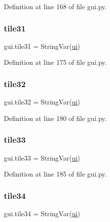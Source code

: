 Definition at line 168 of file gui.\+py.

\mbox{\label{namespacegui_a587d16eda380c21d3eddbf1fbc9716ce}} 
\subsubsection{\texorpdfstring{tile31}{tile31}}
{\footnotesize\ttfamily gui.\+tile31 = String\+Var(\mbox{\hyperlink{namespacegui_a40ab7281456eadbea2dc2038f5c24fa1}{ui}})}



Definition at line 175 of file gui.\+py.

\mbox{\label{namespacegui_a54c6af9760148973c56dea68ffa9b9c7}} 
\subsubsection{\texorpdfstring{tile32}{tile32}}
{\footnotesize\ttfamily gui.\+tile32 = String\+Var(\mbox{\hyperlink{namespacegui_a40ab7281456eadbea2dc2038f5c24fa1}{ui}})}



Definition at line 180 of file gui.\+py.

\mbox{\label{namespacegui_aa338802b7dcd13afe3034f0bd6b4ac4e}} 
\subsubsection{\texorpdfstring{tile33}{tile33}}
{\footnotesize\ttfamily gui.\+tile33 = String\+Var(\mbox{\hyperlink{namespacegui_a40ab7281456eadbea2dc2038f5c24fa1}{ui}})}



Definition at line 185 of file gui.\+py.

\mbox{\label{namespacegui_a4f827dfac57ca6256640fa244ffa1453}} 
\subsubsection{\texorpdfstring{tile34}{tile34}}
{\footnotesize\ttfamily gui.\+tile34 = String\+Var(\mbox{\hyperlink{namespacegui_a40ab7281456eadbea2dc2038f5c24fa1}{ui}})}



